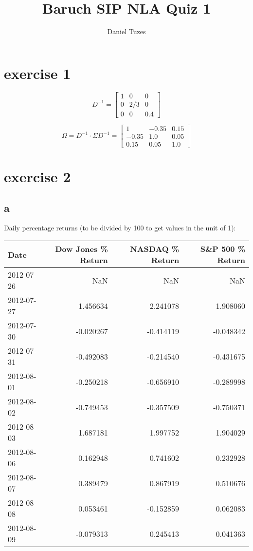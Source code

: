 \documentclass{article}
\title{Baruch SIP NLA Quiz 1}
\author{Daniel Tuzes}
\begin{document}
\maketitle

\section{exercise 1}
\begin{equation}
    D^{-1}=
    \left[\begin{matrix}1 & 0 & 0\\0 & 2/3 & 0\\0 & 0 & 0.4\end{matrix}\right]
\end{equation}

\begin{equation}
    \Omega = D^{-1}\cdot \Sigma D^{-1} = \left[\begin{matrix}1 & -0.35 & 0.15\\-0.35 & 1.0 & 0.05\\0.15 & 0.05 & 1.0\end{matrix}\right]
\end{equation}

\section{exercise 2}
\subsection{a}
Daily percentage returns (to be divided by 100 to get values in the unit of 1):

\begin{tabular}{lrrr}
    \toprule
    Date       & Dow Jones \% Return & NASDAQ \% Return & S\&P 500 \% Return \\
    \midrule
    2012-07-26 & NaN                 & NaN              & NaN                \\
    2012-07-27 & 1.456634            & 2.241078         & 1.908060           \\
    2012-07-30 & -0.020267           & -0.414119        & -0.048342          \\
    2012-07-31 & -0.492083           & -0.214540        & -0.431675          \\
    2012-08-01 & -0.250218           & -0.656910        & -0.289998          \\
    2012-08-02 & -0.749453           & -0.357509        & -0.750371          \\
    2012-08-03 & 1.687181            & 1.997752         & 1.904029           \\
    2012-08-06 & 0.162948            & 0.741602         & 0.232928           \\
    2012-08-07 & 0.389479            & 0.867919         & 0.510676           \\
    2012-08-08 & 0.053461            & -0.152859        & 0.062083           \\
    2012-08-09 & -0.079313           & 0.245413         & 0.041363           \\
    \bottomrule
\end{tabular}
\end{document}
